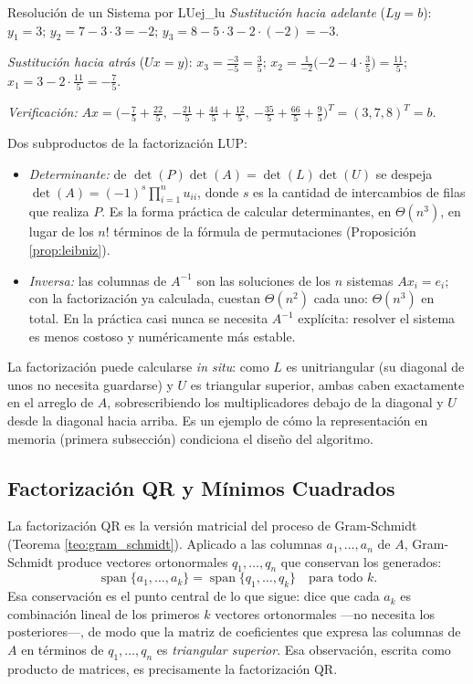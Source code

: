 \documentclass[11pt, a4paper]{article}
\begin{document}
\begin{ejemplo}{Resolución de un Sistema por LU}{ej_lu}
\textit{Sustitución hacia adelante} ($Ly = b$): $y_1 = 3$; $y_2 = 7 - 3 \cdot 3 = -2$; $y_3 = 8 - 5 \cdot 3 - 2 \cdot (-2) = -3$.

\textit{Sustitución hacia atrás} ($Ux = y$): $x_3 = \frac{-3}{-5} = \frac{3}{5}$; $x_2 = \frac{1}{-2} \big( {-2} - 4 \cdot \frac{3}{5} \big) = \frac{11}{5}$; $x_1 = 3 - 2 \cdot \frac{11}{5} = -\frac{7}{5}$.

\textit{Verificación:} $A x = \big( {-\frac{7}{5}} + \frac{22}{5}, \ {-\frac{21}{5}} + \frac{44}{5} + \frac{12}{5}, \ {-\frac{35}{5}} + \frac{66}{5} + \frac{9}{5} \big)^T = (3, 7, 8)^T = b$.
\end{ejemplo}

\obs Dos subproductos de la factorización LUP:
\begin{itemize}
    \item \textit{Determinante:} de $\det(P) \det(A) = \det(L) \det(U)$ se despeja $\det(A) = (-1)^s \prod_{i=1}^n u_{ii}$, donde $s$ es la cantidad de intercambios de filas que realiza $P$. Es la forma práctica de calcular determinantes, en $\Theta(n^3)$, en lugar de los $n!$ términos de la fórmula de permutaciones (Proposición \ref{prop:leibniz}).
    \item \textit{Inversa:} las columnas de $A^{-1}$ son las soluciones de los $n$ sistemas $A x_i = e_i$; con la factorización ya calculada, cuestan $\Theta(n^2)$ cada uno: $\Theta(n^3)$ en total. En la práctica casi nunca se necesita $A^{-1}$ explícita: resolver el sistema es menos costoso y numéricamente más estable.
\end{itemize}

\obs La factorización puede calcularse \emph{in situ}: como $L$ es unitriangular (su diagonal de unos no necesita guardarse) y $U$ es triangular superior, ambas caben exactamente en el arreglo de $A$, sobrescribiendo los multiplicadores debajo de la diagonal y $U$ desde la diagonal hacia arriba. Es un ejemplo de cómo la representación en memoria (primera subsección) condiciona el diseño del algoritmo.

\subsection{Factorización QR y Mínimos Cuadrados}

La factorización QR es la versión matricial del proceso de Gram-Schmidt (Teorema \ref{teo:gram_schmidt}). Aplicado a las columnas $a_1, \dots, a_n$ de $A$, Gram-Schmidt produce vectores ortonormales $q_1, \dots, q_n$ que conservan los generados:
\[
\operatorname{span}\{a_1, \dots, a_k\} = \operatorname{span}\{q_1, \dots, q_k\} \quad \text{para todo } k.
\]
Esa conservación es el punto central de lo que sigue: dice que cada $a_k$ es combinación lineal de los primeros $k$ vectores ortonormales —no necesita los posteriores—, de modo que la matriz de coeficientes que expresa las columnas de $A$ en términos de $q_1, \dots, q_n$ es \emph{triangular superior}. Esa observación, escrita como producto de matrices, es precisamente la factorización QR.
\end{document}
